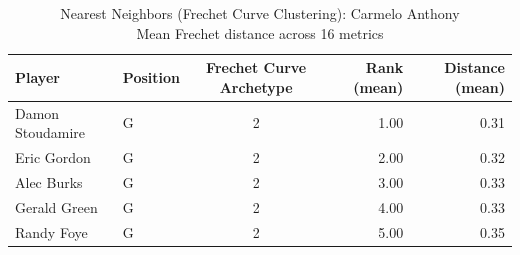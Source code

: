 \begin{table}[t]
\caption*{
{\fontsize{20}{25} Nearest Neighbors (Frechet Curve Clustering): Carmelo Anthony\fontsize{12}{15}\selectfont } \\ 
{\fontsize{14}{17}\selectfont  Mean Frechet distance across 16 metrics\fontsize{12}{15}\selectfont }
} 
\fontsize{12.0pt}{14.0pt}\selectfont
\begin{tabular*}{\linewidth}{@{\extracolsep{\fill}}llcrr}
\toprule
Player & Position & Frechet Curve Archetype & Rank (mean) & Distance (mean) \\ 
\midrule\addlinespace[2.5pt]
Damon Stoudamire & G & 2 & 1.00 & 0.31 \\ 
Eric Gordon & G & 2 & 2.00 & 0.32 \\ 
Alec Burks & G & 2 & 3.00 & 0.33 \\ 
Gerald Green & G & 2 & 4.00 & 0.33 \\ 
Randy Foye & G & 2 & 5.00 & 0.35 \\ 
\bottomrule
\end{tabular*}
\end{table}

